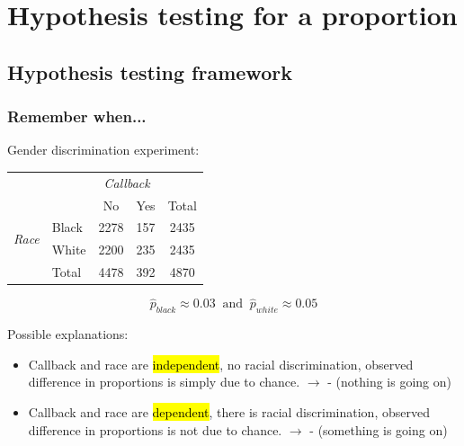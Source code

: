 \documentclass[notes,11pt, aspectratio=169]{beamer}
\begin{document}

\section{Hypothesis testing for a proportion}


\subsection{Hypothesis testing framework}


\begin{frame}
\frametitle{Remember when...}

Gender discrimination experiment:

{\footnotesize
\begin{tabular}{ll  cc c} 
  		&				& \multicolumn{2}{c}{\textit{Callback}} \\
\cline{3-4}
							&			& No	& Yes 	& Total	\\
\cline{2-5}
\multirow{2}{*}{\textit{Race	}}	& Black 		& 2278	 	& 157		& 2435 	\\
							& White		& 2200	 	& 235 	 	& 2435 \\
\cline{2-5}
							&Total		& 4478		& 392		& 4870 \\
\end{tabular}
}

\pause

\[ \hat{p}_{black} \approx 0.03 ~ \text{ and } ~ \hat{p}_{white} \approx 0.05 \]

\pause

Possible explanations:
\begin{itemize}
\item Callback and race are \hl{independent}, no racial discrimination, observed difference in proportions is simply due to chance. $\rightarrow$  - {\small (nothing is going on)}
\item Callback and race are \hl{dependent}, there is racial discrimination, observed difference in proportions is not due to chance. $\rightarrow$  - {\small (something is going on)}

\end{itemize}

\end{frame}


\end{document}
